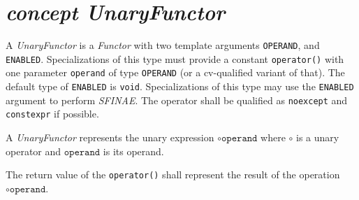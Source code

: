 \section{\textit{concept UnaryFunctor}}
A \textit{UnaryFunctor} is a \textit{Functor} with two template arguments
\verb+OPERAND+,
and
\verb+ENABLED+.
Specializations of this type must provide a constant \verb+operator()+ with one parameter
\verb+operand+ of type \verb+OPERAND+ (or a cv-qualified variant of that). The    default
type of \verb+ENABLED+ is \verb+void+. Specializations of this type may use           the
\verb+ENABLED+ argument to perform \textit{SFINAE}. The operator shall be    qualified as
\texttt{noexcept} and \texttt{constexpr} if possible.\newline

\noindent{}A \textit{UnaryFunctor} represents the unary expression $\circ\texttt{operand}$
where $\circ$ is a unary operator and        $\texttt{operand}$ is its operand.\newline

\noindent{}The return value of the \verb+operator()+ shall represent the result of     the
operation $\circ\texttt{operand}$.
